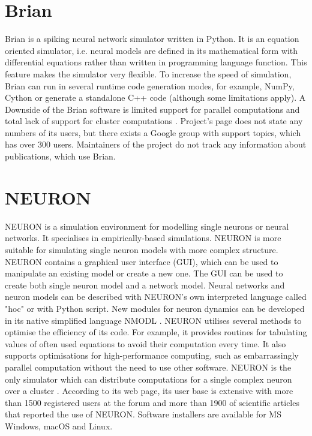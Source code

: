 \section{Brian}

Brian is a spiking neural network simulator written in Python. It is an equation oriented simulator, i.e. neural models are defined in its mathematical form with differential equations rather than written in programming language function. This feature makes the simulator very flexible. To increase the speed of simulation, Brian can run in several runtime code generation modes, for example, NumPy, Cython or generate a standalone C++ code (although some limitations apply). A Downside of the Brian software is limited support for parallel computations and total lack of support for cluster computations \cite{tikidji-hamburyanSoftwareBrainNetwork2017}. Project's page does not state any numbers of its users, but there exists a Google group \cite{Brian} with support topics, which has over 300 users. Maintainers of the project do not track any information about publications, which use Brian.

\section{NEURON}

NEURON is a simulation environment for modelling single neurons or neural networks. It specialises in empirically-based simulations. NEURON is more suitable for simulating single neuron models with more complex structure. NEURON contains a graphical user interface (GUI), which can be used to manipulate an existing model or create a new one. The GUI can be used to create both single neuron model and a network model. Neural networks and neuron models can be described with NEURON's own interpreted language called "hoc" or with Python script. New modules for neuron dynamics can be developed in its native simplified language NMODL \cite{tikidji-hamburyanSoftwareBrainNetwork2017}. NEURON utilises several methods to optimise the efficiency of its code. For example, it provides routines for tabulating values of often used equations to avoid their computation every time. It also supports optimisations for high-performance computing, such as embarrassingly parallel computation without the need to use other software. NEURON is the only simulator which can distribute computations for a single complex neuron over a cluster \cite{tikidji-hamburyanSoftwareBrainNetwork2017}. According to its web page, its user base is extensive with more than 1500 registered users at the forum and more than 1900 of scientific articles that reported the use of NEURON. Software installers are available for MS Windows, macOS and Linux.

